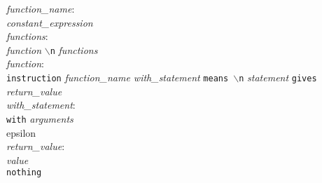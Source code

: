 \documentclass[a4paper]{article}
\begin{document}
\noindent\textit{function\_name}:\\
\indent\textit{constant\_expression}\\

\noindent\textit{functions}:\\
\indent\textit{function} \texttt{$\backslash$n} \textit{functions}\\

\noindent\textit{function}:\\
\indent\texttt{instruction} \textit{function\_name with\_statement} \texttt{means $\backslash$n} \textit{statement} \texttt{gives} \textit{return\_value}\\

\noindent\textit{with\_statement}:\\
\indent\texttt{with} \textit{arguments}\\
\indent epsilon\\

\noindent\textit{return\_value}:\\
\indent\textit{value}\\
\indent \texttt{nothing}
\end{document}
